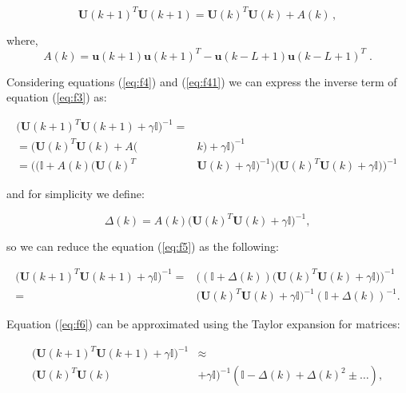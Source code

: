\begin{equation}\label{eq:f4}
\mathbf{U}(k+1)^T\mathbf{U}(k+1)= 
\mathbf{U}(k)^T\mathbf{U}(k) + A(k)\, ,
\end{equation}

where, 
\begin{equation}
A(k) =\mathbf{u}(k+1) \mathbf{u}(k+1)^T - \mathbf{u}(k-L+1) \mathbf{u}(k-L+1)^T \; .
\label{eq:f41}
\end{equation}

Considering equations (\ref{eq:f4}) and (\ref{eq:f41}) we can express the inverse term of equation (\ref{eq:f3}) as:

\begin{align}
\big(\mathbf{U}(k+1)^T\mathbf{U}(k+1) + 
\gamma \mathbb{I} \big)^{-1}= &
 \nonumber\\
= \big(\mathbf{U}(k)^T\mathbf{U}(k) + A(&k) +
\gamma \mathbb{I} \big)^{-1} \nonumber\\
= \big( ( \mathbb{I} + A(k) \big(\mathbf{U}(k)^T&\mathbf{U}(k) +  \gamma \mathbb{I} \big)^{-1} ) 
\big(\mathbf{U}(k)^T\mathbf{U}(k) + \gamma \mathbb{I} \big) \big)^{-1} \,
\label{eq:f5}
\end{align}

and for simplicity we define:

\begin{equation}
	\Delta(k) = A(k) \big(\mathbf{U}(k)^T\mathbf{U}(k) +  \gamma \mathbb{I} \big)^{-1},
\end{equation}

so we can reduce the equation (\ref{eq:f5}) as the following:


\begin{eqnarray}
	\big(\mathbf{U}(k+1)^T\mathbf{U}(k+1) + 
\gamma \mathbb{I} \big)^{-1}=&\big( ( \mathbb{I} + \Delta(k)) 
\big(\mathbf{U}(k)^T\mathbf{U}(k) + \gamma \mathbb{I} \big) \big)^{-1} \nonumber \\
=& \big(\mathbf{U}(k)^T\mathbf{U}(k) + \gamma \mathbb{I} \big) ^{-1} ( \mathbb{I} + \Delta(k)) ^{-1}.
\label{eq:f6}
\end{eqnarray}


Equation (\ref{eq:f6}) can be approximated using the Taylor expansion for matrices:

\begin{equation}
\begin{split}
	\big(\mathbf{U}(k+1)^T\mathbf{U}(k+1) + 
\gamma \mathbb{I} \big)^{-1} & \approx \\
\big(\mathbf{U}(k)^T\mathbf{U}(k) &+ \gamma \mathbb{I} \big) ^{-1} 
( \mathbb{I} - \Delta(k) + \Delta(k)^2 \pm \dots),
\end{split}
\end{equation}

